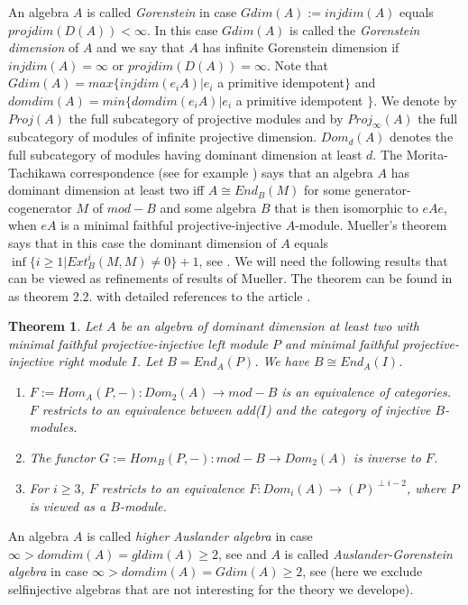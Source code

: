 \documentclass[a4paper]{amsart}
\newtheorem{theorem}{Theorem}[section]
\theoremstyle{definition}
\theoremstyle{remark}
\numberwithin{equation}{theorem}
\begin{document}
An algebra $A$ is called \emph{Gorenstein} in case $Gdim(A):=injdim(A)$ equals $projdim(D(A))< \infty$. In this case $Gdim(A)$ is called the \emph{Gorenstein dimension} of $A$ and we say that $A$ has infinite Gorenstein dimension if $injdim(A)= \infty$ or $projdim(D(A))= \infty$. Note that $Gdim(A)= max \{ injdim(e_iA) | e_i$ a primitive idempotent$ \}$ and $domdim(A)= min \{ domdim(e_iA) | e_i $ a primitive idempotent $ \}$.
We denote by $Proj(A)$ the full subcategory of projective modules and by $Proj_{\infty}(A)$ the full subcategory of modules of infinite projective dimension. $Dom_d(A)$ denotes the full subcategory of modules having dominant dimension at least $d$.
The Morita-Tachikawa correspondence (see for example \cite{Ta}) says that an algebra $A$ has dominant dimension at least two iff $A \cong End_B(M)$ for some generator-cogenerator $M$ of $mod-B$ and some algebra $B$ that is then isomorphic to $eAe$, when $eA$ is a minimal faithful projective-injective $A$-module. Mueller's theorem says that in this case the dominant dimension of $A$ equals $\inf \{ i \geq 1 | Ext_B^{i}(M,M) \neq 0 \} +1$, see \cite{Mue}.
We will need the following results that can be viewed as refinements of results of Mueller. The theorem can be found in \cite{Mar} as theorem 2.2. with detailed references to the article \cite{APT}.
\begin{theorem}
\label{ARSmaintheorem}
Let $A$ be an algebra of dominant dimension at least two with minimal faithful projective-injective left module $P$ and minimal faithful projective-injective right module $I$. Let $B=End_A(P)$. We have $B \cong End_A(I)$.
\begin{enumerate}
\item $F:=Hom_A(P,-) : Dom_2(A) \rightarrow mod-B$ is an equivalence of categories.
$F$ restricts to an equivalence between add($I$) and the category of injective $B$-modules.
\item The functor $G:=Hom_{B}(P,-) : mod-B \rightarrow Dom_2(A)$ is inverse to $F$.
\item For $i \geq 3$, $F$ restricts to an equivalence $F: Dom_i(A) \rightarrow (P)^{\perp i-2}$, where $P$ is viewed as a $B$-module.
\end{enumerate}
\end{theorem}
An algebra $A$ is called \emph{higher Auslander algebra} in case $\infty>domdim(A)=gldim(A) \geq 2$, see \cite{Iya} and $A$ is called \emph{Auslander-Gorenstein algebra} in case $\infty>domdim(A)=Gdim(A) \geq 2$, see \cite{IyaSol} (here we exclude selfinjective algebras that are not interesting for the theory we develope).
\end{document}
